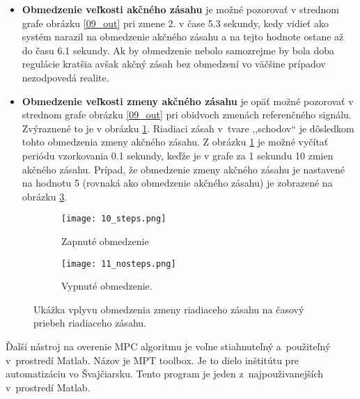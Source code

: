 \begin{itemize}
  \item \textbf{Obmedzenie veľkosti akčného zásahu} je možné pozorovať v strednom grafe obrázku \ref{09_out} pri zmene 2. v čase 5.3 sekundy, kedy vidieť ako systém narazil na obmedzenie akčného zásahu a na tejto hodnote ostane až do času 6.1 sekundy. Ak by obmedzenie nebolo samozrejme by bola doba regulácie kratšia avšak akčný zásah bez obmedzení vo väčšine prípadov nezodpovedá realite.
  \item \textbf{Obmedzenie veľkosti zmeny akčného zásahu} je opäť možné pozorovať v strednom grafe obrázku \ref{09_out} pri obidvoch zmenách referenčného signálu. Zvýraznené to je v obrázku \ref{10_steps}. Riadiaci zásah v~tvare ,,schodov`` je dôsledkom tohto obmedzenia zmeny akčného zásahu. Z obrázku \ref{10_steps} je možné vyčítať periódu vzorkovania 0.1 sekundy, keďže je v grafe za 1 sekundu 10 zmien akčného zásahu. Prípad, že obmedzenie zmeny akčného zásahu je nastavené na hodnotu 5 (rovnaká ako obmedzenie akčného zásahu) je zobrazené na obrázku \ref{11_nosteps}.
\end{itemize}   


\begin{figure}[h]
\centering
\begin{subfigure}{.5\textwidth}
\texttt{[image: 10\_steps.png]}
\caption{Zapnuté obmedzenie}
\label{10_steps}
\end{subfigure}%
\begin{subfigure}{.5\textwidth}
\texttt{[image: 11\_nosteps.png]}
\caption{Vypnuté obmedzenie.}
\label{11_nosteps}
\end{subfigure}
\caption{Ukážka vplyvu obmedzenia zmeny riadiaceho zásahu na časový priebeh riadiaceho zásahu.}
\end{figure}

Ďalší nástroj na overenie MPC algoritmu je voľne stiahnuteľný
a~použiteľný v~prostredí Matlab. Názov je MPT toolbox. Je to dielo
inštitútu pre automatizáciu vo Švajčiarsku. Tento program je jeden
z~najpouživanejších v~prostredí Matlab.

